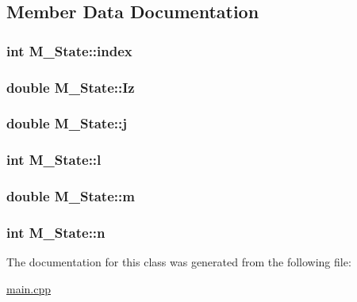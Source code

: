 \subsection{Member Data Documentation}
\hypertarget{class_m___state_a7d8b37c43bf4afe490abd8d8b9f8a292}{
\subsubsection[{index}]{\setlength{\rightskip}{0pt plus 5cm}int M\-\_\-\-State\-::index}}\label{class_m___state_a7d8b37c43bf4afe490abd8d8b9f8a292}
\hypertarget{class_m___state_adf6969c1f683828c2968ca892ef039cf}{
\subsubsection[{Iz}]{\setlength{\rightskip}{0pt plus 5cm}double M\-\_\-\-State\-::\-Iz}}\label{class_m___state_adf6969c1f683828c2968ca892ef039cf}
\hypertarget{class_m___state_a2f5230904bf6ba0c74f9d1bed5e8229d}{
\subsubsection[{j}]{\setlength{\rightskip}{0pt plus 5cm}double M\-\_\-\-State\-::j}}\label{class_m___state_a2f5230904bf6ba0c74f9d1bed5e8229d}
\hypertarget{class_m___state_ad2ba5c44ffd8c57842b2cbd8ddabda4b}{
\subsubsection[{l}]{\setlength{\rightskip}{0pt plus 5cm}int M\-\_\-\-State\-::l}}\label{class_m___state_ad2ba5c44ffd8c57842b2cbd8ddabda4b}
\hypertarget{class_m___state_a2c76c65cf0d884bc8de693c3db782028}{
\subsubsection[{m}]{\setlength{\rightskip}{0pt plus 5cm}double M\-\_\-\-State\-::m}}\label{class_m___state_a2c76c65cf0d884bc8de693c3db782028}
\hypertarget{class_m___state_a27fbcff7783c0ebb82bb04452cdc573b}{
\subsubsection[{n}]{\setlength{\rightskip}{0pt plus 5cm}int M\-\_\-\-State\-::n}}\label{class_m___state_a27fbcff7783c0ebb82bb04452cdc573b}


The documentation for this class was generated from the following file\-:\begin{DoxyCompactItemize}
\item 
\hyperlink{main_8cpp}{main.\-cpp}\end{DoxyCompactItemize}
